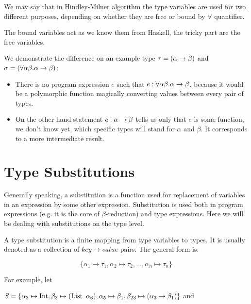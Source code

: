\documentclass[a4paper,oneside]{memoir}
\begin{document}
We may say that in Hindley-Milner algorithm the type variables are used for two different purposes, depending on whether they are free or bound by $\forall$ quantifier.

The bound variables act as we know them from Haskell, the tricky part are the free variables.



We demonstrate the difference 
on an example type $\tau = (\alpha \rightarrow \beta)$ and $\sigma = (\forall \alpha \beta . \alpha \rightarrow \beta)$:
\begin{itemize}
\item There is no program expression $e$ such that $e : \forall \alpha \beta . \alpha \rightarrow \beta$, because it would be a polymorphic function magically converting values between every pair of types.
\item On the other hand statement $e : \alpha \rightarrow \beta$ tells us only that $e$ is some function, we don't know yet, which specific types will stand for $\alpha$ and $\beta$. It corresponds to a more intermediate result.    

\end{itemize}





\section{Type Substitutions}

Generally speaking, a substitution is a function used for replacement 
of variables in an expression by some other expression.
Substitution is used both in program expressions 
(e.g. it is the core of $\beta$-reduction) and type expressions.
Here we will be dealing with substitutions on the type level. 

A type substitution is a finite mapping from type variables to types.
It is usually denoted as a collection of $key \mapsto value$ pairs.
The general form is:

$$\{ \alpha_1 \mapsto \tau_1, \alpha_2 \mapsto \tau_2, \dots, \alpha_n \mapsto \tau_n \}$$ 

For example, let 

$S = \{ \alpha_3 \mapsto \operatorname{Int}, 
\beta_3 \mapsto (\operatorname{List}~\alpha_6),
\alpha_5 \mapsto \beta_1, 
\beta_{23} \mapsto (\alpha_3 \rightarrow \beta_1) \}$ 
and 
\end{document}
